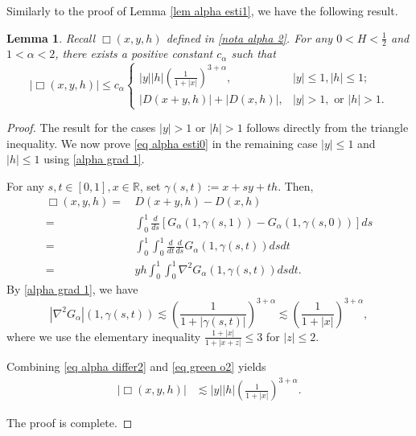 \documentclass[11pt,reqno]{amsart}
\numberwithin{equation}{section}
\newtheorem{lemma}{Lemma}[section]
\newcommand{\1}{{\bf 1}}
\newcommand{\2}{{\bf 2}}
\begin{document}
Similarly to the proof of   Lemma \ref{lem alpha esti1}, we have the following result.
\begin{lemma}\label{lem alpha esti2}
Recall $\Box(x,y,h)$ defined in \eqref{nota alpha 2}. For any $0<H<\frac12$ and $1<\alpha<2$,  there exists a positive constant $c_\alpha$ such that
\begin{equation}\label{eq alpha esti0}
\left|\Box(x,y,h)\right|\le c_{\alpha}
\begin{cases}
|y||h|\left(\frac{1}{1+|x|}\right)^{3+\alpha}, &|y|\le1, |h|\le 1;\\ 
|D(x+y,h)|+|D(x,h)|,& |y|>1,\text{ or } |h|>1.
\end{cases}
\end{equation}
  \end{lemma}
\begin{proof}  
 The result for the cases $|y| > 1$ or $|h| > 1$ follows directly from the triangle inequality.
We now prove \eqref{eq alpha esti0} in the remaining case $|y| \le 1$ and $|h| \le 1$ using \eqref{alpha grad 1}.
 
    For any $s, t\in [0,1], x\in \mathbb{R}$, set $ \gamma(s,t):=x+sy+th$.
 Then, 
  \begin{equation}\label{eq alpha differ2}
  \begin{split}
\Box(x,y,h) =&\, D(x+y,h)-D(x,h) \\
 =&\, \int_0^1\frac{d}{ds}\left[G_{\alpha}(1,\gamma(s,1))- G_{\alpha}(1,\gamma(s,0))\right]ds \\
 =&\, \int_0^1\int_0^1\frac{d}{dt}\frac{d}{ds}G_{\alpha}(1,\gamma(s,t))dsdt \\
  =&\,  yh \int_0^1\int_0^1\nabla^2G_{\alpha}(1,\gamma(s,t)) dsdt. 
 \end{split}
 \end{equation}
By \eqref{alpha grad 1}, we have
 \begin{equation}\label{eq green o2}
 \left|\nabla^2G_{\alpha}\right|(1,\gamma(s,t))\lesssim \left(\frac{1}{1+|\gamma(s,t)|}\right)^{3+\alpha}\lesssim \left(\frac{1}{1+|x|}\right)^{3+\alpha},
 \end{equation}
 where we use   the elementary inequality $\frac{1+|x|}{1+|x+z|} \le 3$ for $|z|\le 2$.
 
 Combining  \eqref{eq alpha differ2} and \eqref{eq green o2} yields
  \begin{align*}
 \left|\Box(x,y,h)\right|&\lesssim |y||h|\left(\frac{1}{1+|x|}\right)^{3+\alpha}.
  \end{align*}
  
     The proof is complete. 
 \end{proof}
 
\end{document}
